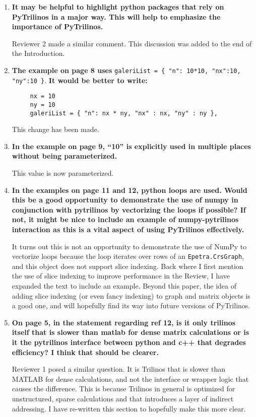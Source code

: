 \documentclass[11pt]{article}
\begin{document}
\begin{enumerate}

\item {\bf It may be helpful to highlight python packages that rely on PyTrilinos in a major way. This will help to emphasize the importance of PyTrilinos.}

Reviewer 2 made a similar comment.  This discussion was added to the end of the Introduction.

\item {\bf The example on page 8 uses} {\tt galeriList = \{ "n": 10*10, "nx":10, "ny":10 \}}.  {\bf It would be better to write:}
  \begin{verbatim}
     nx = 10
     ny = 10
     galeriList = { "n": nx * ny, "nx" : nx, "ny" : ny },
  \end{verbatim}

This change has been made.

\item {\bf In the example on page 9, ``10'' is explicitly used in multiple places without being parameterized.}

This value is now parameterized.

\item {\bf In the examples on page 11 and 12, python loops are used. Would this be a good opportunity to demonstrate the use of numpy in conjunction with pytrilinos by vectorizing the loops if possible? If not, it might be nice to include an example of numpy-pytrilinos interaction as this is a vital aspect of using PyTrilinos effectively.}

It turns out this is not an opportunity to demonstrate the use of NumPy to vectorize loops because the loop iterates over rows of an {\tt Epetra.CrsGraph}, and this object does not support slice indexing.  Back where I first mention the use of slice indexing to improve performance in the Review, I have expanded the text to include an example.  Beyond this paper, the idea of adding slice indexing (or even fancy indexing) to graph and matrix objects is a good one, and will hopefully find its way into future versions of PyTrilinos.

\item {\bf On page 5, in the statement regarding ref 12, is it only trilinos itself that is slower than matlab for dense matrix calculations or is it the pytrilinos interface between python and c++ that degrades efficiency? I think that should be clearer.}

Reviewer 1 posed a similar question.  It is Trilinos that is slower than MATLAB for dense calculations, and not the interface or wrapper logic that causes the difference.  This is because Trilinos in general is optimized for unstructured, sparse calculations and that introduces a layer of indirect addressing.  I have re-written this section to hopefully make this more clear.


\end{enumerate}
\end{document}
